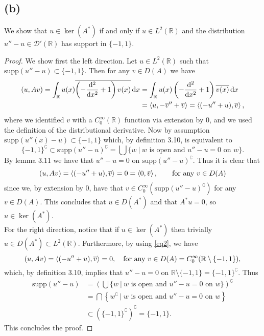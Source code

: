 \documentclass[a4paper,11pt]{article}
\newcommand{\supp}{\text{supp}}
\newcommand*\diff{\mathop{}\!\mathrm{d}}
\newcommand{\R}{\mathbb{R}}
\numberwithin{equation}{section}
\begin{document}
\subsection*{(b)}
We show that $ u\in\ker(A^*) $ if and only if $ u\in L^2(\R) $ and the distribution $ u''-u\in\mathcal{D}'(\R) $ has support in $ \{-1,1\} $.
\begin{proof}
	We show first the left direction. Let $ u\in L^2(\R) $ such that $ \supp(u''-u)\subset\{-1,1\} $. Then for any $ v\in D(A) $ we have \begin{equation}\label{eq2}
	\begin{aligned}
	(u,Av)=\int_{\R}u(x) \overline{\left(-\frac{\diff^2}{\diff x^2}+1\right)v(x)} \diff x&=\int_{\R}u(x) \left(-\frac{\diff^2}{\diff x^2}+1\right)\overline{v(x)} \diff x\\&=\braket{u,-\overline{v}''+\overline{v}}=\braket{ (-u''+u),\overline{v}},
	\end{aligned}
	\end{equation}
	where we identified $ v $ with a $ C^\infty_0(\R) $ function via extension by $ 0 $, and we used the definition of the distributional derivative.
	Now by assumption $ \supp(u''(x)-u)\subset\{-1,1\} $ which, by definition 3.10, is equivalent to $$ \{-1,1\}^\complement\subset\supp(u''-u)^\complement=\bigcup\{w\ \vert\ w\text{ is open and }u''-u=0\text{ on }w \}. $$
	By lemma 3.11 we have that $ u''-u=0 $ on $ \supp(u''-u)^\complement $.
	Thus it is clear that \begin{equation}
	(u,Av)=\braket{ (-u''+u),\overline{v}}=0=\braket{0,\bar{v}}, \qquad\text{for any } v\in D(A)
	\end{equation} 
	since we, by extension by $ 0 $, have that $ v\in C^{\infty}_0\left(\supp(u''-u)^\complement\right) $ for any $ v\in D(A) $. This concludes that $ u\in D(A^*) $ and that $ A^*u=0 $, so $ u\in\ker(A^*) $.\\
	For the right direction, notice that if $ u\in \ker(A^*) $ then trivially $ u\in D(A^*)\subset L^2(\R) $. Furthermore, by using \eqref{eq2}, we have \begin{equation}
	(u,Av)=\braket{ (-u''+u),\overline{v}}=0,\quad \text{for any }v\in D(A)=C_0^\infty(\R\setminus\{-1,1\}),
	\end{equation}
	which, by definition 3.10, implies that $ u''-u=0 $ on $ \R\setminus\{-1,1\}=\{-1,1\}^\complement $. Thus \begin{equation}
	\begin{aligned}
	\supp(u''-u)&=\left(\bigcup\{w\ \vert\ w\text{ is open and }u''-u=0\text{ on }w \}\right)^\complement\\&
	=\bigcap\left\{w^\complement \ \vert\ w\text{ is open and }u''-u=0\text{ on }w \right\}\\&
	\subset\left(\{-1,1\}^\complement\right)^\complement=\{-1,1\}.
	\end{aligned}
	\end{equation}
	This concludes the proof.
\end{proof}
\end{document}
